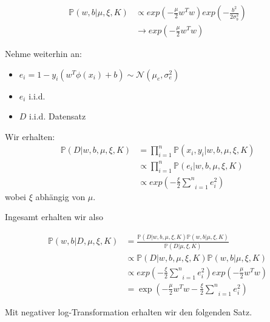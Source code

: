 \documentclass{beamer}
\begin{document}
{\begin{frame}
	\begin{align}
	\mathbb{P}(w,b \vert \mu, \xi, K) &\propto exp(-\frac{\mu}{2}w^Tw)exp(-\frac{b^2}{2\sigma_b^2})\\
	&\rightarrow exp(-\frac{\mu}{2}w^Tw)
	\end{align}


\end{frame}


\begin{frame}


Nehme weiterhin an:
\begin{itemize}
	\item $e_i = 1 - y_i(w^T \phi(x_i) +b) \sim \mathcal{N}(\mu_e,\sigma^2_e)$ 
	\item $e_i$ i.i.d.
	\item $D$ i.i.d. Datensatz
\end{itemize}

Wir erhalten:
\begin{align}
\mathbb{P}(D \vert w,b, \mu, \xi, K) & = \prod_{i=1}^{n}\mathbb{P}(x_i,y_i \vert w,b, \mu, \xi, K) \\
& \propto \prod_{i=1}^{n}\mathbb{P}(e_i\vert w,b, \mu, \xi, K) \\
& \propto exp(-\frac{\xi}{2}\underset{i=1}{\overset{n}{\sum}}e_i^2)
\end{align}
wobei $\xi$ abhängig von $\mu$.

\end{frame}


\begin{frame}
Ingesamt erhalten wir also


\begin{align}
	\mathbb{P}(w,b\vert D,\mu,\xi,K) &= \frac{\mathbb{P}(D\vert w,b, \mu,\xi,K)					\mathbb{P}(w,b\vert \mu,\xi , K)}{\mathbb{P}(D\vert \mu,\xi,K)}  \\
	& \propto \mathbb{P}(D\vert w,b, \mu,\xi,K)\mathbb{P}(w,b\vert \mu,\xi , K) \\
	&\propto exp(-\frac{\xi}{2}\underset{i=1}{\overset{n}{\sum}}e_i^2)exp(-\frac{\mu}{2}		w^Tw) \\
	& = \exp(-\frac{\mu}{2}w^Tw - \frac{\xi}{2}\underset{i=1}{\overset{n}{\sum}}e_i^2)
\end{align}

Mit negativer log-Transformation erhalten wir den folgenden Satz.

\end{frame}


}
\end{document}
